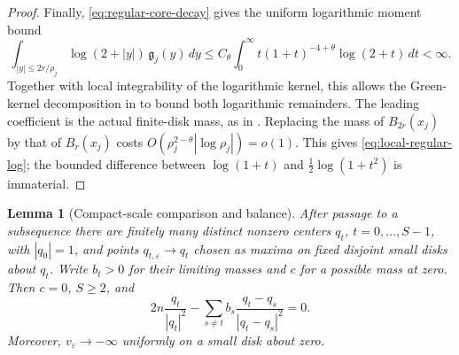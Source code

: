 \documentclass[11pt,reqno]{amsart}
\numberwithin{equation}{section}
\newtheorem{lemma}[theorem]{Lemma}
\theoremstyle{definition}
\theoremstyle{remark}
\newcommand{\eps}{\varepsilon}
\begin{document}
\begin{proof}
Finally, \eqref{eq:regular-core-decay} gives the uniform logarithmic
moment bound
\[
 \int_{|y|\le2r/\rho_j}\log(2+|y|)\,\mathfrak g_j(y)\,dy
 \le C_\theta\int_0^\infty t(1+t)^{-4+\theta}\log(2+t)\,dt<\infty.
\]
Together with local integrability of the logarithmic kernel, this
allows the Green-kernel decomposition in
\cite[proof of Theorem~3.1]{Choe} to bound both logarithmic remainders.
The leading coefficient is the actual finite-disk mass,
as in \cite[equation~(32)]{Choe}. Replacing the mass
of $B_{2r}(x_j)$ by that of $B_r(x_j)$ costs
$O(\rho_j^{2-\theta}|\log\rho_j|)=o(1)$.
This gives \eqref{eq:local-regular-log}; the bounded difference
between $\log(1+t)$ and $\tfrac12\log(1+t^2)$ is immaterial.
\end{proof}

\begin{lemma}[Compact-scale comparison and balance]
\label{lem:compact-cluster-balance}
After passage to a subsequence there are finitely many distinct
nonzero centers $q_t$, $t=0,\ldots,S-1$, with $|q_0|=1$, and
points $q_{t,\eps}\to q_t$ chosen as maxima on fixed disjoint small
disks about $q_t$. Write $b_t>0$ for their limiting masses
and $c$ for a possible mass at zero. Then $c=0$, $S\ge2$, and
\begin{equation}\label{eq:weighted-location-system}
 2n\frac{q_t}{|q_t|^2}
 -\sum_{s\ne t}b_s\frac{q_t-q_s}{|q_t-q_s|^2}=0.
\end{equation}
Moreover, $v_\eps\to-\infty$ uniformly on a small disk about zero.
\end{lemma}
\end{document}
